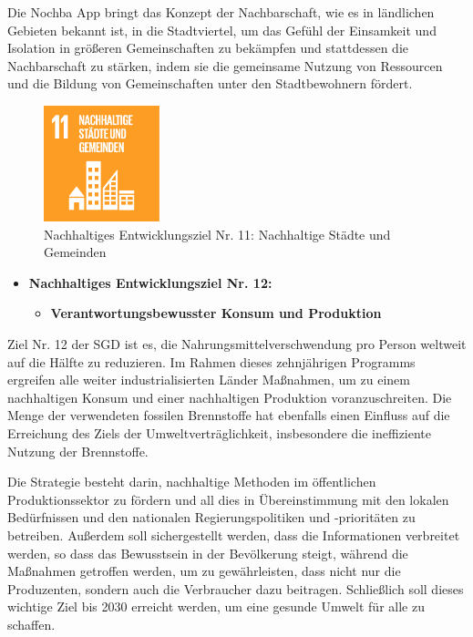 Die Nochba App bringt das Konzept der Nachbarschaft, wie es in ländlichen Gebieten bekannt ist, in die Stadtviertel, um das Gefühl der Einsamkeit und Isolation in größeren Gemeinschaften zu bekämpfen und stattdessen die Nachbarschaft zu stärken, indem sie die gemeinsame Nutzung von Ressourcen und die Bildung von Gemeinschaften unter den Stadtbewohnern fördert.

\begin{figure}[H]
    \centering
    \includegraphics[width=0.3\textwidth]{pics/sdg-image-11-data.png}
    \caption{Nachhaltiges Entwicklungsziel Nr. 11: Nachhaltige Städte und Gemeinden}
    \label{fig:SDG11}
\end{figure}

\begin{itemize}
    \item \textbf{Nachhaltiges Entwicklungsziel Nr. 12:}
          \begin{itemize}
              \item \textbf{Verantwortungsbewusster Konsum und Produktion}
          \end{itemize}
\end{itemize}

Ziel Nr. 12 der SGD ist es, die Nahrungsmittelverschwendung pro Person weltweit auf die Hälfte zu reduzieren. Im Rahmen dieses zehnjährigen Programms ergreifen alle weiter industrialisierten Länder Maßnahmen, um zu einem nachhaltigen Konsum und einer nachhaltigen Produktion voranzuschreiten. Die Menge der verwendeten fossilen Brennstoffe hat ebenfalls einen Einfluss auf die Erreichung des Ziels der Umweltverträglichkeit, insbesondere die ineffiziente Nutzung der Brennstoffe.

Die Strategie besteht darin, nachhaltige Methoden im öffentlichen Produktionssektor zu fördern und all dies in Übereinstimmung mit den lokalen Bedürfnissen und den nationalen Regierungspolitiken und -prioritäten zu betreiben. Außerdem soll sichergestellt werden, dass die Informationen verbreitet werden, so dass das Bewusstsein in der Bevölkerung steigt, während die Maßnahmen getroffen werden, um zu gewährleisten, dass nicht nur die Produzenten, sondern auch die Verbraucher dazu beitragen. Schließlich soll dieses wichtige Ziel bis 2030 erreicht werden, um eine gesunde Umwelt für alle zu schaffen.


